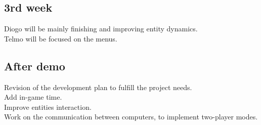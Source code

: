 \documentclass{article}
\theoremstyle{remark}
\begin{document}
\subsection{3rd week}
Diogo will be mainly finishing and improving entity dynamics.\\
Telmo will be focused on the menus.
\subsection{After demo}
Revision of the development plan to fulfill the project needs.\\
Add in-game time.\\
Improve entities interaction.\\
Work on the communication between computers, to implement two-player modes.\\
\end{document}
